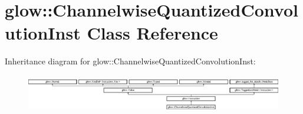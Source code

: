 \hypertarget{classglow_1_1_channelwise_quantized_convolution_inst}{}\section{glow\+:\+:Channelwise\+Quantized\+Convolution\+Inst Class Reference}
\label{classglow_1_1_channelwise_quantized_convolution_inst}
Inheritance diagram for glow\+:\+:Channelwise\+Quantized\+Convolution\+Inst\+:\begin{figure}[H]
\begin{center}
\leavevmode
\includegraphics[height=1.677903cm]{classglow_1_1_channelwise_quantized_convolution_inst}
\end{center}
\end{figure}
